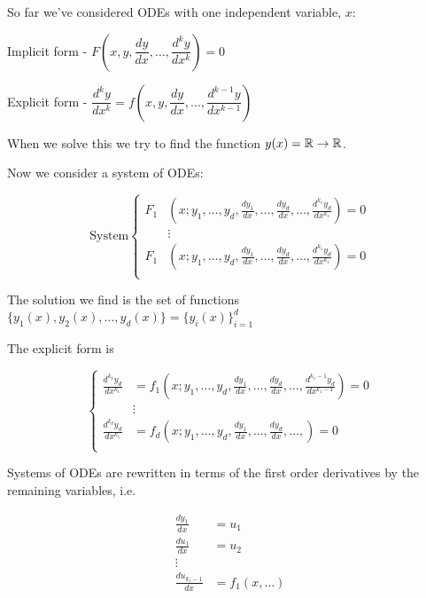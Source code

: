 \documentclass[twoside]{scrartcl}
\begin{document}

So far we've considered ODEs with one independent variable, $x$: 

Implicit form - $F\left(x,y,\dfrac{dy}{dx},\dots,\dfrac{d^ky}{dx^k}\right) = 0$

Explicit form - $\dfrac{d^ky}{dx^k} = f\left(x,y,\dfrac{dy}{dx},\dots,\dfrac{d^{k-1}y}{dx^{k-1}}\right)$

When we solve this we try to find the function $y(x) = \mathbb{R} \to \mathbb{R}$. 

Now we consider a system of ODEs: 

\[
\text{System}
\left\{
\begin{aligned}
F_1&\left(x;y_1,\dots,y_d, \frac{dy_1}{dx},\dots,\frac{dy_d}{dx},\dots,\frac{d^{k_1}y_d}{dx^{k_1}}\right) = 0\\
&\vdots\\
F_1&\left(x;y_1,\dots,y_d, \frac{dy_1}{dx},\dots,\frac{dy_d}{dx},\dots,\frac{d^{k_1}y_d}{dx^{k_1}}\right) = 0\\
\end{aligned}\right.
\]

The solution we find is the set of functions $\{y_1(x),y_2(x),\dots,y_d(x)\} = \{y_i(x)\}_{i=1}^d$

The explicit form is 

\[
\left\{
\begin{aligned}
\frac{d^{k_1}y_d}{dx^{k_1}} &= f_1\left(x;y_1,\dots,y_d, \frac{dy_1}{dx},\dots,\frac{dy_d}{dx},\dots,\frac{d^{k_1-1}y_d}{dx^{k_1-1}}\right) = 0\\
&\vdots\\
\frac{d^{k_d}y_d}{dx^{k_1}} &= f_d\left(x;y_1,\dots,y_d, \frac{dy_1}{dx},\dots,\frac{dy_d}{dx},\dots,\right) = 0\\
\end{aligned}\right.
\]

Systems of ODEs are rewritten in terms of the first order derivatives by the remaining variables, i.e. 

\[
\begin{aligned}
  \frac{dy_1}{dx} &= u_1\\[0.2cm]
  \frac{du_1}{dx} &= u_2\\
  \vdots\\
  \frac{du_{k_1-1}}{dx} &= f_1(x,\dots)
\end{aligned}
\]~
\end{document}
